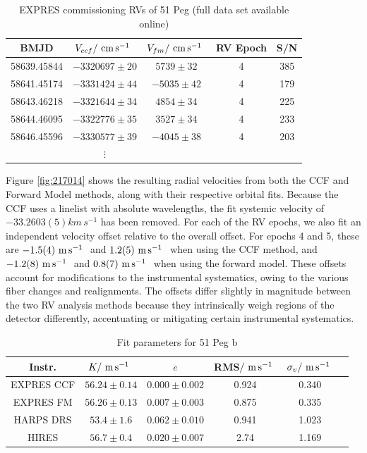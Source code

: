 \begin{table}[ht!]
    \centering
    \caption[51 Peg -- Commissioning radial velocities]{EXPRES commissioning RVs of 51 Peg (full data set available online)
    \label{tab:51pegvels}}
    \begin{tabular}{ccccc}
        \hline
        BMJD & $V_{ccf}/~\si{\centi\meter\per\second}~$ & $V_{fm}/~\si{\centi\meter\per\second}~$ & RV Epoch & S/N
        \tabularnewline
        \hline
        58639.45844 & $-3320697\pm20$ & $ 5739\pm32$ & 4 & 385 \tabularnewline
        58641.45174 & $-3331424\pm44$ & $-5035\pm42$ & 4 & 179 \tabularnewline
        58643.46218 & $-3321644\pm34$ & $ 4854\pm34$ & 4 & 225 \tabularnewline
        58644.46095 & $-3322776\pm35$ & $ 3527\pm34$ & 4 & 233 \tabularnewline
        58646.45596 & $-3330577\pm39$ & $-4045\pm38$ & 4 & 203 \tabularnewline
         & \(\vdots\) & & \tabularnewline
        \hline
    \end{tabular}
\end{table}

Figure \ref{fig:217014} shows the resulting radial velocities from both the CCF and Forward Model methods, along with their respective orbital fits. Because the CCF uses a linelist with absolute wavelengths, the fit systemic velocity of $-33.2603(5)\unit{km\,s^{-1}}$ \citep[in excellent agreement with][]{gaia_collaboration_vizier_2018} has been removed. For each of the RV epochs, we also fit an independent velocity offset relative to the overall offset. For epochs 4 and 5, these are $-1.5(4)~\si{\meter\per\second}~$ and $1.2(5)~\si{\meter\per\second}~$ when using the CCF method, and $-1.2(8)~\si{\meter\per\second}~$ and $0.8(7)~\si{\meter\per\second}~$ when using the forward model. These offsets account for modifications to the instrumental systematics, owing to the various fiber changes and realignments. The offsets differ slightly in magnitude between the two RV analysis methods because they intrinsically weigh regions of the detector differently, accentuating or mitigating certain instrumental systematics.

\begin{table}[ht!]
\centering
\caption[51 Peg b -- Keplerian orbital fit parameters]{Fit parameters for 51 Peg b\label{tab:51peg}}
\begin{tabular}{cccccc}
\hline
Instr. & $K/~\si{\meter\per\second}~$ & $e$ & RMS$/~\si{\meter\per\second}~$ & $\sigma_v/~\si{\meter\per\second}~$ \tabularnewline
\hline
EXPRES CCF & $56.24\pm0.14$ & $0.000\pm0.002$ & 0.924 & 0.340 \tabularnewline
EXPRES FM & $56.26\pm0.13$ & $0.007\pm0.003$ & 0.875 & 0.335 \tabularnewline
HARPS DRS & $53.4\pm1.6$ & $0.062\pm0.010$ & 0.941 & 1.023 \tabularnewline
HIRES & $56.7\pm0.4$ & $0.020\pm0.007$ & 2.74 & 1.169 \tabularnewline
\hline
\end{tabular}
\end{table}

